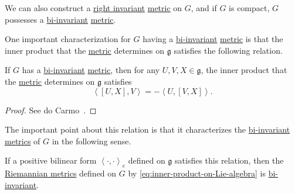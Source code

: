 \begin{remark}
	We can also construct a \hyperref[def:Riemannian-metric-right-invariant]{right invariant} \hyperref[def:Riemannian-metric]{metric} on \(G\), and if \(G\) is compact, \(G\) possesses a \hyperref[def:Riemannian-metric-left-invariant]{bi-invariant} \hyperref[def:Riemannian-metric]{metric}.
\end{remark}

One important characterization for \(G\) having a \hyperref[def:Riemannian-metric-left-invariant]{bi-invariant} \hyperref[def:Riemannian-metric]{metric} is that the inner product that the \hyperref[def:Riemannian-metric]{metric} determines on \(\mathfrak{g} \) satisfies the following relation.

\begin{proposition}
	If \(G\) has a \hyperref[def:Riemannian-metric-left-invariant]{bi-invariant} \hyperref[def:Riemannian-metric]{metric}, then for any \(U, V, X\in \mathfrak{g} \), the inner product that the \hyperref[def:Riemannian-metric]{metric} determines on \(\mathfrak{g} \) satisfies
	\[
		\left\langle [U, X], V \right\rangle = -\left\langle U, [V, X] \right\rangle.
	\]
\end{proposition}
\begin{proof}
	See do Carmo~\cite[Page 40, 41]{flaherty2013riemannian}.
\end{proof}

The important point about this relation is that it characterizes the \hyperref[def:Riemannian-metric-left-invariant]{bi-invariant} \hyperref[def:Riemannian-metric]{metrics} of \(G\) in the following sense.

\begin{remark}
	If a positive bilinear form \(\left\langle \cdot, \cdot \right\rangle _e \) defined on \(\mathfrak{g} \) satisfies this relation, then the \hyperref[def:Riemannian-metric]{Riemannian metrics} defined on \(G\) by \autoref{eq:inner-product-on-Lie-algebra} is \hyperref[def:Riemannian-metric-left-invariant]{bi-invariant}.
\end{remark}